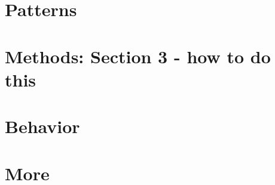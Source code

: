 \section{Patterns} 



\section{Methods: Section 3 - how to do this} 




\section{Behavior} 


\section{More} 







